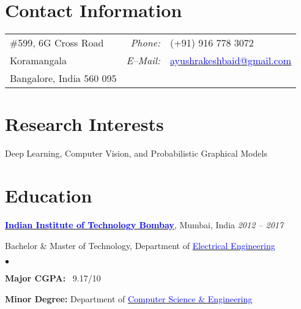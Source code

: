 \documentclass[margin,line,hidelinks]{res}
\newenvironment{list1}{
  \begin{list}{\ding{113}}{%
      \setlength{\itemsep}{0in}
      \setlength{\parsep}{0in} \setlength{\parskip}{0in}
      \setlength{\topsep}{0in} \setlength{\partopsep}{0in} 
      \setlength{\leftmargin}{0.17in}}}{\end{list}}
\newenvironment{list2}{
  \begin{list}{$\bullet$}{%
      \setlength{\itemsep}{0in}
      \setlength{\parsep}{0in} \setlength{\parskip}{0in}
      \setlength{\topsep}{0in} \setlength{\partopsep}{0in} 
      \setlength{\leftmargin}{0.2in}}}{\end{list}}
\begin{document}

\begin{resume}
\section{\sc Contact Information}
\vspace{.05in}
\begin{tabular}{@{}p{2.9in}p{.5in}p{3in}}
\#599, 6G Cross Road 
& \multicolumn{1}{r}{\it Phone:}  
&(+91) 916 778 3072 \\            
Koramangala 
&\multicolumn{1}{r}{\it E--Mail:}& \href{mailto:ayushrakeshbaid@gmail.com}{\textcolor{blue}{ayushrakeshbaid@gmail.com}} \\ 
Bangalore, India 560 095  \\     
\end{tabular}

\section{\sc Research Interests}
Deep Learning, Computer Vision, and Probabilistic Graphical Models

\section{\sc Education}
{\bf \href{http://www.iitb.ac.in/}{\textcolor{blue}{Indian Institute of Technology Bombay}}}, Mumbai, India \hfill {\it 2012 -- 2017} \\
\vspace*{-.1in}
\begin{list1}
\item[] Bachelor \& Master of Technology, Department of \href{http://www.ee.iitb.ac.in/}{\textcolor{blue}{Electrical Engineering}}
\begin{list2}
\vspace*{.05in}
\item \textbf{Major CGPA:}  \ 9.17/10
\item \textbf{Minor Degree:}  Department of \href{http://www.cse.iitb.ac.in/}{\textcolor{blue}{Computer Science \& Engineering}}
\end{list2}
\end{list1}



\end{resume}
\end{document}
